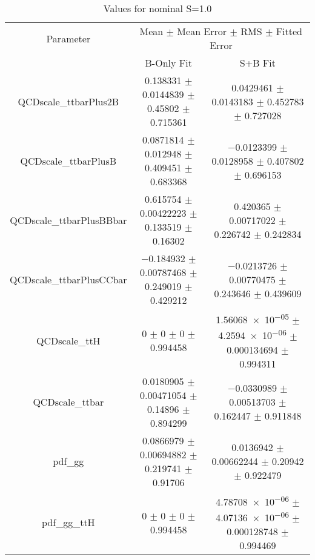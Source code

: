 \begin{table}
\centering
\caption{Values for nominal S=1.0}
\begin{tabular}{ccc}
\toprule
Parameter & \multicolumn{2}{c}{Mean $\pm$ Mean Error $\pm$ RMS $\pm$ Fitted Error}\\
 & B-Only Fit & S+B Fit\\
\midrule
QCDscale\_ttbarPlus2B & \num{0.138331} $\pm$ \num{0.0144839} $\pm$ \num{0.45802} $\pm$ \num{0.715361} & \num{0.0429461} $\pm$ \num{0.0143183} $\pm$ \num{0.452783} $\pm$ \num{0.727028}\\
QCDscale\_ttbarPlusB & \num{0.0871814} $\pm$ \num{0.012948} $\pm$ \num{0.409451} $\pm$ \num{0.683368} & \num{-0.0123399} $\pm$ \num{0.0128958} $\pm$ \num{0.407802} $\pm$ \num{0.696153}\\
QCDscale\_ttbarPlusBBbar & \num{0.615754} $\pm$ \num{0.00422223} $\pm$ \num{0.133519} $\pm$ \num{0.16302} & \num{0.420365} $\pm$ \num{0.00717022} $\pm$ \num{0.226742} $\pm$ \num{0.242834}\\
QCDscale\_ttbarPlusCCbar & \num{-0.184932} $\pm$ \num{0.00787468} $\pm$ \num{0.249019} $\pm$ \num{0.429212} & \num{-0.0213726} $\pm$ \num{0.00770475} $\pm$ \num{0.243646} $\pm$ \num{0.439609}\\
QCDscale\_ttH & \num{0} $\pm$ \num{0} $\pm$ \num{0} $\pm$ \num{0.994458} & \num{1.56068e-05} $\pm$ \num{4.2594e-06} $\pm$ \num{0.000134694} $\pm$ \num{0.994311}\\
QCDscale\_ttbar & \num{0.0180905} $\pm$ \num{0.00471054} $\pm$ \num{0.14896} $\pm$ \num{0.894299} & \num{-0.0330989} $\pm$ \num{0.00513703} $\pm$ \num{0.162447} $\pm$ \num{0.911848}\\
pdf\_gg & \num{0.0866979} $\pm$ \num{0.00694882} $\pm$ \num{0.219741} $\pm$ \num{0.91706} & \num{0.0136942} $\pm$ \num{0.00662244} $\pm$ \num{0.20942} $\pm$ \num{0.922479}\\
pdf\_gg\_ttH & \num{0} $\pm$ \num{0} $\pm$ \num{0} $\pm$ \num{0.994458} & \num{4.78708e-06} $\pm$ \num{4.07136e-06} $\pm$ \num{0.000128748} $\pm$ \num{0.994469}\\
\bottomrule
\end{tabular}
\end{table}